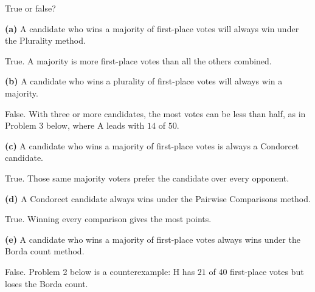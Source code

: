 \documentclass[12pt]{ximera}
\begin{document}
\begin{problem}
True or false?

\begin{prompt}
\textbf{(a)} A candidate who wins a majority of first-place votes will always win under
the Plurality method.
\begin{multipleChoice}
\end{multipleChoice}
\begin{feedback}
True. A majority is more first-place votes than all the others combined.
\end{feedback}
\end{prompt}

\begin{prompt}
\textbf{(b)} A candidate who wins a plurality of first-place votes will always win a
majority.
\begin{multipleChoice}
\end{multipleChoice}
\begin{feedback}
False. With three or more candidates, the most votes can be less than half, as in
Problem 3 below, where A leads with $14$ of $50$.
\end{feedback}
\end{prompt}

\begin{prompt}
\textbf{(c)} A candidate who wins a majority of first-place votes is always a Condorcet
candidate.
\begin{multipleChoice}
\end{multipleChoice}
\begin{feedback}
True. Those same majority voters prefer the candidate over every opponent.
\end{feedback}
\end{prompt}

\begin{prompt}
\textbf{(d)} A Condorcet candidate always wins under the Pairwise Comparisons method.
\begin{multipleChoice}
\end{multipleChoice}
\begin{feedback}
True. Winning every comparison gives the most points.
\end{feedback}
\end{prompt}

\begin{prompt}
\textbf{(e)} A candidate who wins a majority of first-place votes always wins under the
Borda count method.
\begin{multipleChoice}
\end{multipleChoice}
\begin{feedback}
False. Problem 2 below is a counterexample: H has $21$ of $40$ first-place votes but
loses the Borda count.
\end{feedback}
\end{prompt}


\end{problem}
\end{document}
